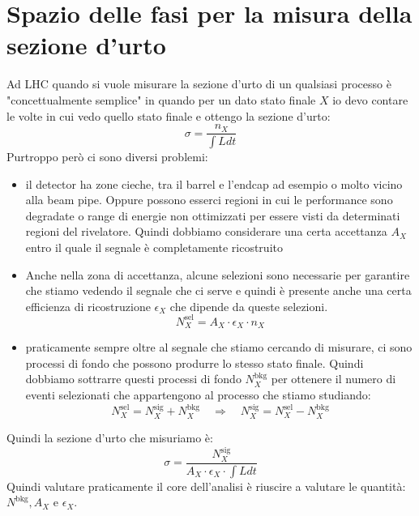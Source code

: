 \documentclass[11pt]{article}
\begin{document}
\section{Spazio delle fasi per la misura della sezione d'urto}
Ad LHC quando si vuole misurare la sezione d'urto di un qualsiasi processo è "concettualmente semplice" in quando per un dato stato finale $X$ io devo contare le volte in cui vedo quello stato finale e ottengo la sezione d'urto:
\begin{equation*}
    \sigma = \frac{n_X}{\int Ldt}
\end{equation*}
Purtroppo però ci sono diversi problemi:
\begin{itemize}
    \item il detector ha zone cieche, tra il barrel e l'endcap ad esempio o molto vicino alla beam pipe. Oppure possono esserci regioni in cui le performance sono degradate o range di energie non ottimizzati per essere visti da determinati regioni del rivelatore. Quindi dobbiamo considerare una certa accettanza $A_X$ entro il quale il segnale è completamente ricostruito
    \item Anche nella zona di accettanza, alcune selezioni sono necessarie per garantire che stiamo vedendo il segnale che ci serve e quindi è presente anche una certa efficienza di ricostruzione $\epsilon_X$ che dipende da queste selezioni.
    \begin{equation*}
        N^{\text{sel}}_X=A_X\cdot \epsilon_X \cdot n_X
    \end{equation*}
    \item praticamente sempre oltre al segnale che stiamo cercando di misurare, ci sono processi di fondo che possono produrre lo stesso stato finale. Quindi dobbiamo sottrarre questi processi di fondo $N^{\text{bkg}}_X$ per ottenere il numero di eventi selezionati che appartengono al processo che stiamo studiando:
    \begin{equation*}
        N^{\text{sel}}_X=N^{\text{sig}}_X+N^{\text{bkg}}_X \quad \Rightarrow \quad N^{\text{sig}}_X=N^{\text{sel}}_X-N^{\text{bkg}}_X
    \end{equation*}
\end{itemize}
Quindi la sezione d'urto che misuriamo è:
\begin{equation*}
    \sigma = \frac{N^{\text{sig}}_X}{A_X\cdot \epsilon_X \cdot \int Ldt}
\end{equation*}
Quindi valutare praticamente il core dell'analisi è riuscire a valutare le quantità: $N^\text{bkg}, A_X $ e $\epsilon_X$.
\end{document}

